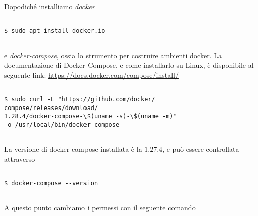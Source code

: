 \documentclass[14pt]{extreport}
\begin{document}
Dopodiché installiamo \textit{docker}

\vspace{10pt}
{
\small
\begin{tcolorbox}

\begin{verbatim}

$ sudo apt install docker.io
  
\end{verbatim}

\end{tcolorbox}
}

\vspace{18pt}


e \textit{docker-compose}, ossia lo strumento per costruire ambienti docker. La documentazione di Docker-Compose, e come installarlo su Linux, è disponibile al seguente link: \url{https://docs.docker.com/compose/install/}


\vspace{10pt}
{
\small
\begin{tcolorbox}

\begin{verbatim}

$ sudo curl -L "https://github.com/docker/
compose/releases/download/
1.28.4/docker-compose-\$(uname -s)-\$(uname -m)" 
-o /usr/local/bin/docker-compose
  
\end{verbatim}

\end{tcolorbox}
}

\vspace{18pt}


La versione di docker-compose installata è la $1.27.4$, e può essere controllata attraverso

\vspace{10pt}

{
\small
\begin{tcolorbox}

\begin{verbatim}

$ docker-compose --version
  
\end{verbatim}

\end{tcolorbox}
}

\vspace{18pt}

A questo punto cambiamo i permessi con il seguente comando
\end{document}

